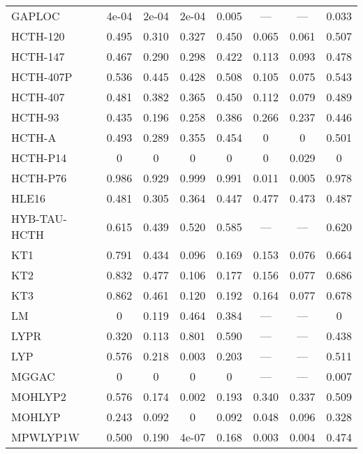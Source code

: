 \begin{table*}
\begin{tabular}{|l|c|c|c|c|c|c|c|}
GAPLOC~\cite{Fabiano2014_2016} & 4e-04 & 2e-04 & 2e-04 & 0.005 & --- & --- & 0.033 \\
HCTH-120~\cite{Boese2000_1670} & 0.495 & 0.310 & 0.327 & 0.450 & 0.065 & 0.061 & 0.507 \\
HCTH-147~\cite{Boese2000_1670} & 0.467 & 0.290 & 0.298 & 0.422 & 0.113 & 0.093 & 0.478 \\
HCTH-407P~\cite{Boese2003_5965} & 0.536 & 0.445 & 0.428 & 0.508 & 0.105 & 0.075 & 0.543 \\
HCTH-407~\cite{Boese2001_5497} & 0.481 & 0.382 & 0.365 & 0.450 & 0.112 & 0.079 & 0.489 \\
HCTH-93~\cite{Hamprecht1998_6264} & 0.435 & 0.196 & 0.258 & 0.386 & 0.266 & 0.237 & 0.446 \\
HCTH-A~\cite{Hamprecht1998_6264} & 0.493 & 0.289 & 0.355 & 0.454 & 0 & 0 & 0.501 \\
HCTH-P14~\cite{Menconi2001_3958} & 0 & 0 & 0 & 0 & 0 & 0.029 & 0 \\
HCTH-P76~\cite{Menconi2001_3958} & 0.986 & 0.929 & 0.999 & 0.991 & 0.011 & 0.005 & 0.978 \\
HLE16~\cite{Verma2017_380} & 0.481 & 0.305 & 0.364 & 0.447 & 0.477 & 0.473 & 0.487 \\
HYB-TAU-HCTH~\cite{Boese2002_9559} & 0.615 & 0.439 & 0.520 & 0.585 & --- & --- & 0.620 \\
KT1~\cite{Keal2003_3015} & 0.791 & 0.434 & 0.096 & 0.169 & 0.153 & 0.076 & 0.664 \\
KT2~\cite{Keal2003_3015} & 0.832 & 0.477 & 0.106 & 0.177 & 0.156 & 0.077 & 0.686 \\
KT3~\cite{Keal2004_5654} & 0.862 & 0.461 & 0.120 & 0.192 & 0.164 & 0.077 & 0.678 \\
LM~\cite{Langreth1981_446,Hu1985_391} & 0 & 0.119 & 0.464 & 0.384 & --- & --- & 0 \\
LYPR~\cite{Ai2021_1207} & 0.320 & 0.113 & 0.801 & 0.590 & --- & --- & 0.438 \\
LYP~\cite{Lee1988_785,Miehlich1989_200} & 0.576 & 0.218 & 0.003 & 0.203 & --- & --- & 0.511 \\
MGGAC~\cite{Patra2019_155140} & 0 & 0 & 0 & 0 & --- & --- & 0.007 \\
MOHLYP2~\cite{Zheng2009_808} & 0.576 & 0.174 & 0.002 & 0.193 & 0.340 & 0.337 & 0.509 \\
MOHLYP~\cite{Schultz2005_11127} & 0.243 & 0.092 & 0 & 0.092 & 0.048 & 0.096 & 0.328 \\
MPWLYP1W~\cite{Dahlke2005_15677} & 0.500 & 0.190 & 4e-07 & 0.168 & 0.003 & 0.004 & 0.474 \\

\end{tabular}
\end{table*}
